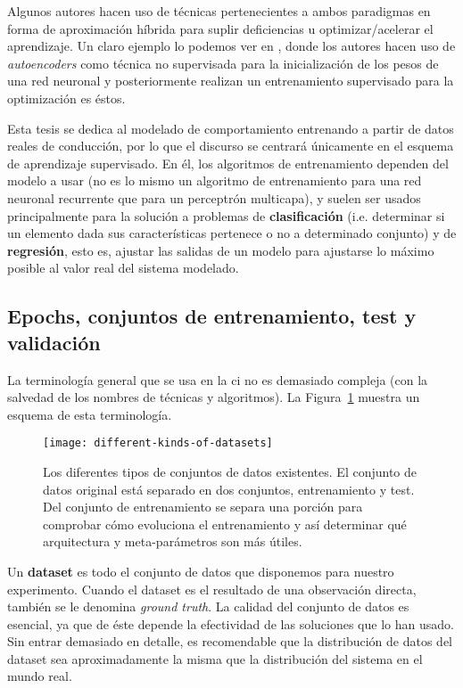 Algunos autores hacen uso de técnicas pertenecientes a ambos paradigmas en forma de aproximación híbrida para suplir deficiencias u optimizar/acelerar el aprendizaje. Un claro ejemplo lo podemos ver en \cite{Hinton2006}, donde los autores hacen uso de \textit{autoencoders} como técnica no supervisada para la inicialización de los pesos de una red neuronal y posteriormente realizan un entrenamiento supervisado para la optimización es éstos.

Esta tesis se dedica al modelado de comportamiento entrenando a partir de datos reales de conducción, por lo que el discurso se centrará únicamente en el esquema de aprendizaje supervisado. En él, los algoritmos de entrenamiento dependen del modelo a usar (no es lo mismo un algoritmo de entrenamiento para una red neuronal recurrente que para un perceptrón multicapa), y suelen ser usados principalmente para la solución a problemas de \textbf{clasificación} (i.e. determinar si un elemento dada sus características pertenece o no a determinado conjunto) y de \textbf{regresión}, esto es, ajustar las salidas de un modelo para ajustarse lo máximo posible al valor real del sistema modelado.

\subsection{Epochs, conjuntos de entrenamiento, test y validación}

La terminología general que se usa en la \gls{ci} no es demasiado compleja (con la salvedad de los nombres de técnicas y algoritmos). La Figura~\ref{fig:different-kinds-of-datasets} muestra un esquema de esta terminología.

\begin{figure}
	\texttt{[image: different-kinds-of-datasets]}
	\caption[Separación clásica de conjuntos de datos en problemas de ]{Los diferentes tipos de conjuntos de datos existentes. El conjunto de datos original está separado en dos conjuntos, entrenamiento y test. Del conjunto de entrenamiento se separa una porción para comprobar cómo evoluciona el entrenamiento y así determinar qué arquitectura y meta-parámetros son más útiles.}
	\label{fig:different-kinds-of-datasets}
\end{figure}

Un \textbf{dataset} es todo el conjunto de datos que disponemos para nuestro experimento. Cuando el dataset es el resultado de una observación directa, también se le denomina \textit{ground truth}. La calidad del conjunto de datos es esencial, ya que de éste depende la efectividad de las soluciones que lo han usado. Sin entrar demasiado en detalle, es recomendable que la distribución de datos del dataset sea aproximadamente la misma que la distribución del sistema en el mundo real.

